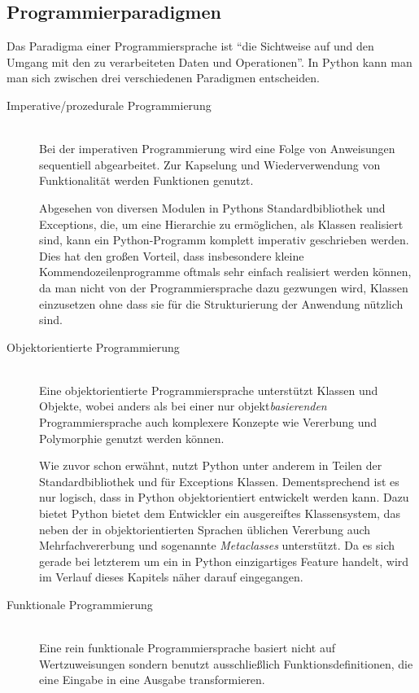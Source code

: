 \subsection{Programmierparadigmen}

Das Paradigma einer Programmiersprache ist \enquote{die Sichtweise auf und den Umgang mit
den zu verarbeiteten Daten und Operationen}. \citep[Kap. 1.3.1]{progsprachen} In Python kann man
man sich zwischen drei verschiedenen Paradigmen entscheiden.

\begin{description}
\item[Imperative/prozedurale Programmierung] \hfill \\
Bei der imperativen Programmierung wird eine Folge von Anweisungen sequentiell abgearbeitet. Zur
Kapselung und Wiederverwendung von Funktionalität werden Funktionen genutzt.
\citep[Kap. 1.3.1]{progsprachen}

Abgesehen von diversen Modulen in Pythons Standardbibliothek und Exceptions, die, um eine Hierarchie
zu ermöglichen, als Klassen realisiert sind, kann ein Python-Programm komplett imperativ geschrieben
werden. Dies hat den großen Vorteil, dass insbesondere kleine Kommendozeilenprogramme oftmals sehr
einfach realisiert werden können, da man nicht von der Programmiersprache dazu gezwungen wird,
Klassen einzusetzen ohne dass sie für die Strukturierung der Anwendung nützlich sind.



\item[Objektorientierte Programmierung] \hfill \\
Eine objektorientierte Programmiersprache unterstützt Klassen und Objekte, wobei anders als bei
einer nur objekt\emph{basierenden} Programmiersprache auch komplexere Konzepte wie Vererbung und
Polymorphie genutzt werden können.
\citep[Kap. 1.3.1]{progsprachen}

Wie zuvor schon erwähnt, nutzt Python unter anderem in Teilen der Standardbibliothek und für
Exceptions Klassen. Dementsprechend ist es nur logisch, dass in Python objektorientiert entwickelt
werden kann. Dazu bietet Python bietet dem Entwickler ein ausgereiftes Klassensystem, das neben der
in objektorientierten Sprachen üblichen Vererbung auch Mehrfachvererbung und sogenannte
\emph{Metaclasses} unterstützt. Da es sich gerade bei letzterem um ein in Python einzigartiges
Feature handelt, wird im Verlauf dieses Kapitels näher darauf eingegangen.



\item[Funktionale Programmierung] \hfill \\
Eine rein funktionale Programmiersprache basiert nicht auf Wertzuweisungen sondern benutzt
ausschließlich Funktionsdefinitionen, die eine Eingabe in eine Ausgabe transformieren.
\citep[Kap. 1.3.1]{progsprachen}


\end{description}
